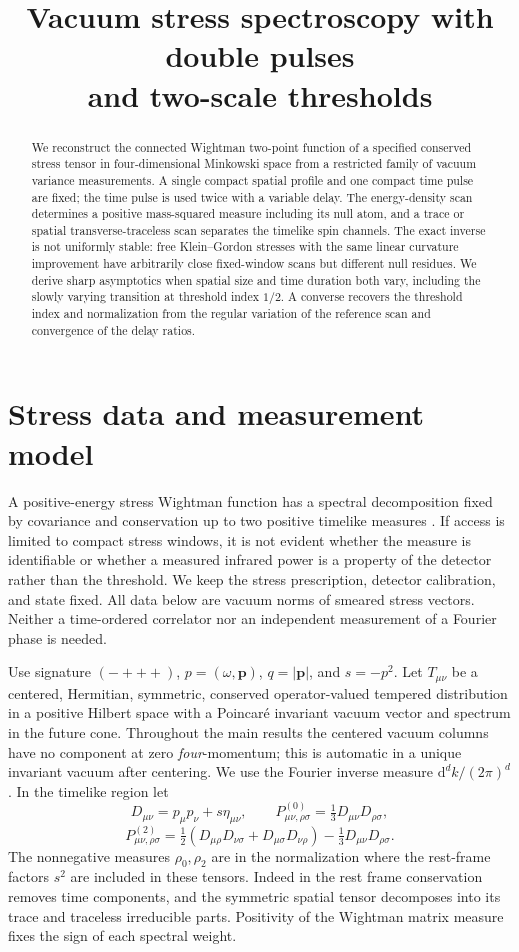\documentclass[11pt]{article}
\title{Vacuum stress spectroscopy with double pulses\\ and two-scale thresholds}
\author{}
\date{}
\theoremstyle{remark}
\newcommand{\dd}{\mathrm d}
\begin{document}
\maketitle
\begin{abstract}
We reconstruct the connected Wightman two-point function of a specified
conserved stress tensor in four-dimensional Minkowski space from a
restricted family of vacuum variance measurements. A single compact
spatial profile and one compact time pulse are fixed; the time pulse is
used twice with a variable delay. The energy-density scan determines
a positive mass-squared measure including its null atom, and a trace or
spatial transverse-traceless scan separates the timelike spin channels.
The exact inverse is not uniformly stable: free Klein--Gordon stresses
with the same linear curvature improvement have arbitrarily close
fixed-window scans but different null residues. We derive sharp
asymptotics when spatial size and time duration both vary, including
the slowly varying transition at threshold index \(1/2\). A converse
recovers the threshold index and normalization from the regular
variation of the reference scan and convergence of the delay ratios.
\end{abstract}

\section{Stress data and measurement model}

A positive-energy stress Wightman function has a spectral
decomposition fixed by covariance and conservation up to two
positive timelike measures \cite{CFL,Karateev}. If access is limited
to compact stress windows, it is not evident whether the measure is
identifiable or whether a measured infrared power is a property of the
detector rather than the threshold. We keep the stress prescription,
detector calibration, and state fixed. All data below are vacuum norms
of smeared stress vectors. Neither a time-ordered correlator nor an
independent measurement of a Fourier phase is needed.

Use signature \((-+++)\), \(p=(\omega,\mathbf p)\),
\(q=|\mathbf p|\), and \(s=-p^2\).
Let \(T_{\mu\nu}\) be a centered, Hermitian, symmetric, conserved
operator-valued tempered distribution in a positive Hilbert space
with a Poincar\'e invariant vacuum vector and spectrum in the future
cone. Throughout the main results the centered vacuum columns have
no component at zero \emph{four}-momentum; this is automatic in a
unique invariant vacuum after centering. We use the Fourier inverse
measure \(\dd^d k/(2\pi)^d\). In the timelike region let
\[
 D_{\mu\nu}=p_\mu p_\nu+s\eta_{\mu\nu},\qquad
 P^{(0)}_{\mu\nu,\rho\sigma}=\tfrac13D_{\mu\nu}D_{\rho\sigma},
\]
\[
 P^{(2)}_{\mu\nu,\rho\sigma}=
 \tfrac12(D_{\mu\rho}D_{\nu\sigma}+D_{\mu\sigma}D_{\nu\rho})
 -\tfrac13D_{\mu\nu}D_{\rho\sigma}.
\]
The nonnegative measures \(\rho_0,\rho_2\) are in the normalization
where the rest-frame factors \(s^2\) are included in these tensors.
Indeed in the rest frame conservation removes time components,
and the symmetric spatial tensor decomposes into its trace and
traceless irreducible parts. Positivity of the Wightman matrix
measure fixes the sign of each spectral weight.
\end{document}
